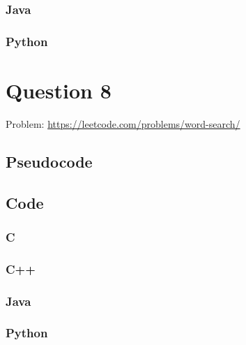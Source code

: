\documentclass[11pt]{article}
\begin{document}
\subsubsection{Java}
\subsubsection{Python}

\newpage

\section{Question 8}
Problem: \url{https://leetcode.com/problems/word-search/}

\subsection{Pseudocode}

\subsection{Code}
\subsubsection{C}
\subsubsection{C++}
\subsubsection{Java}
\subsubsection{Python}
\end{document}
